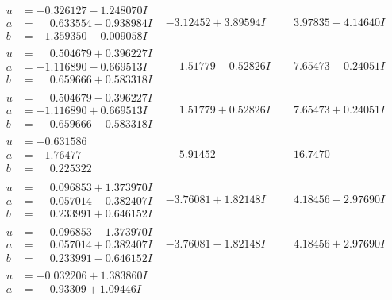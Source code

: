 \documentclass[1p]{elsarticle_modified}
\theoremstyle{definition}
\begin{document}
$$\begin{array}{c|c|c}
\begin{aligned}
u &= -0.326127 - 1.248070 I \\
a &= \phantom{-}0.633554 - 0.938984 I \\
b &= -1.359350 - 0.009058 I\end{aligned}
 & -3.12452 + 3.89594 I & \phantom{-}3.97835 - 4.14640 I \\ \hline\begin{aligned}
u &= \phantom{-}0.504679 + 0.396227 I \\
a &= -1.116890 - 0.669513 I \\
b &= \phantom{-}0.659666 + 0.583318 I\end{aligned}
 & \phantom{-}1.51779 - 0.52826 I & \phantom{-}7.65473 - 0.24051 I \\ \hline\begin{aligned}
u &= \phantom{-}0.504679 - 0.396227 I \\
a &= -1.116890 + 0.669513 I \\
b &= \phantom{-}0.659666 - 0.583318 I\end{aligned}
 & \phantom{-}1.51779 + 0.52826 I & \phantom{-}7.65473 + 0.24051 I \\ \hline\begin{aligned}
u &= -0.631586\phantom{ +0.000000I} \\
a &= -1.76477\phantom{ +0.000000I} \\
b &= \phantom{-}0.225322\phantom{ +0.000000I}\end{aligned}
 & \phantom{-}5.91452\phantom{ +0.000000I} & \phantom{-}16.7470\phantom{ +0.000000I} \\ \hline\begin{aligned}
u &= \phantom{-}0.096853 + 1.373970 I \\
a &= \phantom{-}0.057014 - 0.382407 I \\
b &= \phantom{-}0.233991 + 0.646152 I\end{aligned}
 & -3.76081 + 1.82148 I & \phantom{-}4.18456 - 2.97690 I \\ \hline\begin{aligned}
u &= \phantom{-}0.096853 - 1.373970 I \\
a &= \phantom{-}0.057014 + 0.382407 I \\
b &= \phantom{-}0.233991 - 0.646152 I\end{aligned}
 & -3.76081 - 1.82148 I & \phantom{-}4.18456 + 2.97690 I \\ \hline\begin{aligned}
u &= -0.032206 + 1.383860 I \\
a &= \phantom{-}0.93309 + 1.09446 I \\

\end{aligned}
\end{array}$$
\end{document}

